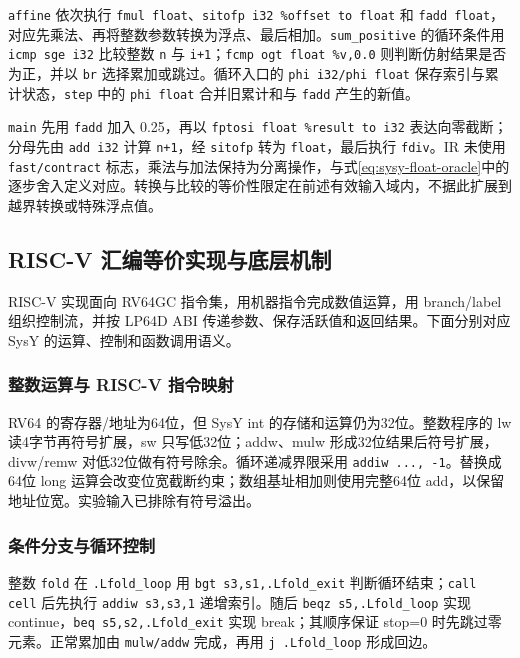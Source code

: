 \texttt{affine} 依次执行 \texttt{fmul float}、\texttt{sitofp i32 \%offset to float} 和 \texttt{fadd float}，对应先乘法、再将整数参数转换为浮点、最后相加。\texttt{sum\_positive} 的循环条件用 \texttt{icmp sge i32} 比较整数 \texttt{n} 与 \texttt{i+1}；\texttt{fcmp ogt float \%v,0.0} 则判断仿射结果是否为正，并以 \texttt{br} 选择累加或跳过。循环入口的 \texttt{phi i32/phi float} 保存索引与累计状态，\texttt{step} 中的 \texttt{phi float} 合并旧累计和与 \texttt{fadd} 产生的新值。

\texttt{main} 先用 \texttt{fadd} 加入 0.25，再以 \texttt{fptosi float \%result to i32} 表达向零截断；分母先由 \texttt{add i32} 计算 \texttt{n+1}，经 \texttt{sitofp} 转为 \texttt{float}，最后执行 \texttt{fdiv}。IR 未使用 \texttt{fast/contract} 标志，乘法与加法保持为分离操作，与式\eqref{eq:sysy-float-oracle}中的逐步舍入定义对应。转换与比较的等价性限定在前述有效输入域内，不据此扩展到越界转换或特殊浮点值。

\subsection{RISC-V 汇编等价实现与底层机制}
\label{sec:sysy-riscv}
RISC-V 实现面向 RV64GC 指令集，用机器指令完成数值运算，用 branch/label 组织控制流，并按 LP64D ABI 传递参数、保存活跃值和返回结果。下面分别对应 SysY 的运算、控制和函数调用语义。

\subsubsection{整数运算与 RISC-V 指令映射}
\label{sec:sysy-riscv-integer}

RV64 的寄存器/地址为64位，但 SysY int 的存储和运算仍为32位。整数程序的 lw 读4字节再符号扩展，sw 只写低32位；addw、mulw 形成32位结果后符号扩展，divw/remw 对低32位做有符号除余。循环递减界限采用 \texttt{addiw ..., -1}\cite{riscv-isa}。替换成64位 long 运算会改变位宽截断约束；数组基址相加则使用完整64位 add，以保留地址位宽。实验输入已排除有符号溢出。

\subsubsection{条件分支与循环控制}
\label{sec:sysy-riscv-branches}
整数 \texttt{fold} 在 \texttt{.Lfold\_loop} 用 \texttt{bgt s3,s1,.Lfold\_exit} 判断循环结束；\texttt{call cell} 后先执行 \texttt{addiw s3,s3,1} 递增索引。随后 \texttt{beqz s5,.Lfold\_loop} 实现 continue，\texttt{beq s5,s2,.Lfold\_exit} 实现 break；其顺序保证 stop=0 时先跳过零元素。正常累加由 \texttt{mulw/addw} 完成，再用 \texttt{j .Lfold\_loop} 形成回边。

